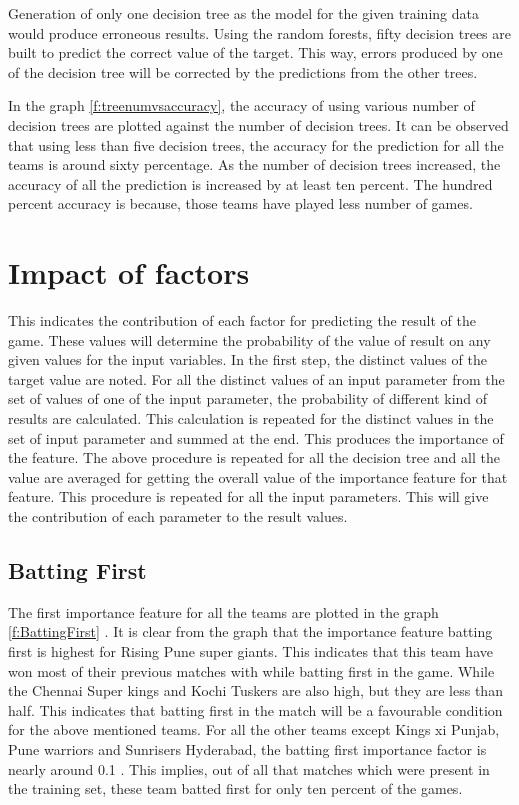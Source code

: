 \documentclass[sigconf]{acmart}
\begin{document}
Generation of only one decision tree as the model for the given training data would produce erroneous results. Using the random forests, fifty decision trees are built to predict the correct value of the target. This way, errors produced by one of the decision tree will be corrected by the predictions from the other trees.


In the graph \ref{f:treenumvsaccuracy}, the accuracy of using various number of decision trees are plotted against the number of decision trees. It can be observed that using less than five decision trees, the accuracy for the prediction for all the teams is around sixty percentage. As the number of decision trees increased, the accuracy of all the prediction is increased by at least ten percent. The hundred percent accuracy is because, those teams have played less number of games.

\section{Impact of factors}

This indicates the contribution of each factor for predicting the result of the game. These values will determine the probability of the value of result on any given values for the input variables. In the first step, the distinct values of the target value are noted. For all the distinct values of an input parameter from the set of values of one of the input parameter, the probability of different kind of results  are calculated. This calculation is repeated for the distinct values in the set of input parameter and summed at the end. This produces the importance of the feature. The above procedure is repeated for all the decision tree and all the value are averaged for getting the overall value of the importance feature for that feature. This procedure is repeated for all the input parameters. This will give the contribution of each parameter to the result values. 

\subsection{Batting First}

The first importance feature for all the teams are plotted in the graph \ref{f:BattingFirst} . It is clear from the graph that the importance feature batting first is highest for Rising Pune super giants. This indicates that this team have won most of their previous matches with while batting first in the game. While the Chennai Super kings and Kochi Tuskers are also high, but they are less than half. This indicates that batting first in the match will be a favourable condition for the above mentioned   teams. For all the other teams except Kings xi Punjab, Pune warriors and Sunrisers Hyderabad, the batting first importance factor is nearly around 0.1 . This implies, out of all that matches which were present in the training set, these team batted first for only ten percent of the games. 
\end{document}
